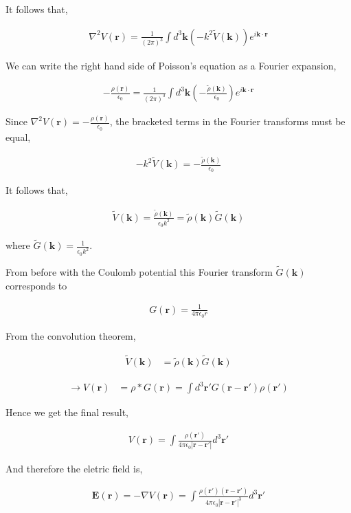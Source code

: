 \documentclass[11pt]{amsart}
\begin{document}
It follows that,

\begin{align*}
  \nabla^2 V(\mathbf{r}) = \frac{1}{{(2\pi)}^3}\int d^3\mathbf{k}(-k^2 \tilde{V}(\mathbf{k})) e^{i\mathbf{k}\cdot\mathbf{r}}
\end{align*}

We can write the right hand side of Poisson's equation as a Fourier expansion,

\begin{align*}
  -\frac{\rho(\mathbf{r})}{\epsilon_0} = \frac{1}{{(2\pi)}^3}\int d^3\mathbf{k} \left(-\frac{\tilde{\rho}(\mathbf{k})}{\epsilon_0}\right) e^{i\mathbf{k}\cdot\mathbf{r}}
\end{align*}

Since $\nabla^2 V(\mathbf{r}) = -\frac{\rho(\mathbf{r})}{\epsilon_0}$, the bracketed terms in the Fourier transforms must be equal,

\begin{align*}
  -k^2 \tilde{V}(\mathbf{k}) = -\frac{\tilde{\rho}(\mathbf{k})}{\epsilon_0}
\end{align*}

It follows that,

\begin{align*}
  \tilde{V}(\mathbf{k}) = \frac{\tilde{\rho}(\mathbf{k})}{\epsilon_0 k^2} = \tilde{\rho}(\mathbf{k}) \tilde{G}(\mathbf{k})
\end{align*}

where $\tilde{G}(\mathbf{k}) = \frac{1}{\epsilon_0 k^2}$.

From before with the Coulomb potential this Fourier transform $\tilde{G}(\mathbf{k})$ corresponds to

\begin{align*}
  G(\mathbf{r}) = \frac{1}{4\pi\epsilon_0 r}
\end{align*}

From the convolution theorem,

\begin{align*}
  \tilde{V}(\mathbf{k}) &= \tilde{\rho}(\mathbf{k})\tilde{G}(\mathbf{k})
\end{align*}

\begin{align*}
  \to V(\mathbf{r}) &= \rho * G(\mathbf{r}) = \int d^3 \mathbf{r'} G(\mathbf{r} - \mathbf{r'}) \rho(\mathbf{r'})
\end{align*}

Hence we get the final result,

\begin{align*}
  V(\mathbf{r}) = \int \frac{\rho(\mathbf{r'})}{4\pi\epsilon_0 |\mathbf{r} - \mathbf{r'}|} d^3 \mathbf{r'}
\end{align*}

And therefore the eletric field is,

\begin{align*}
  \mathbf{E}(\mathbf{r}) = -\nabla V(\mathbf{r}) = \int \frac{\rho(\mathbf{r'}) (\mathbf{r} - \mathbf{r'})}{4\pi\epsilon_0 {|\mathbf{r} - \mathbf{r'}|}^3} d^3 \mathbf{r'}
\end{align*}
\end{document}
